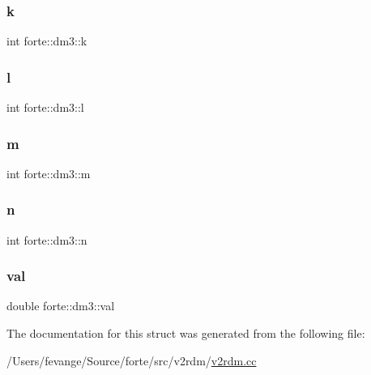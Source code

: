 \mbox{\label{structforte_1_1dm3_ada31a56207b990eff9662bf12b44f2a7}} 
\subsubsection{\texorpdfstring{k}{k}}
{\footnotesize\ttfamily int forte\+::dm3\+::k}

\mbox{\label{structforte_1_1dm3_adc5c51d37c4f9f1b1a84d2bad25ac005}} 
\subsubsection{\texorpdfstring{l}{l}}
{\footnotesize\ttfamily int forte\+::dm3\+::l}

\mbox{\label{structforte_1_1dm3_a4c2b5fae81b47c86f292ad99f7c573ac}} 
\subsubsection{\texorpdfstring{m}{m}}
{\footnotesize\ttfamily int forte\+::dm3\+::m}

\mbox{\label{structforte_1_1dm3_a8feb5d038920b11b07055922b79ce366}} 
\subsubsection{\texorpdfstring{n}{n}}
{\footnotesize\ttfamily int forte\+::dm3\+::n}

\mbox{\label{structforte_1_1dm3_a8548c69e2324672d49f1a221e965df68}} 
\subsubsection{\texorpdfstring{val}{val}}
{\footnotesize\ttfamily double forte\+::dm3\+::val}



The documentation for this struct was generated from the following file\+:\begin{DoxyCompactItemize}
\item 
/\+Users/fevange/\+Source/forte/src/v2rdm/\mbox{\hyperlink{v2rdm_8cc}{v2rdm.\+cc}}\end{DoxyCompactItemize}
